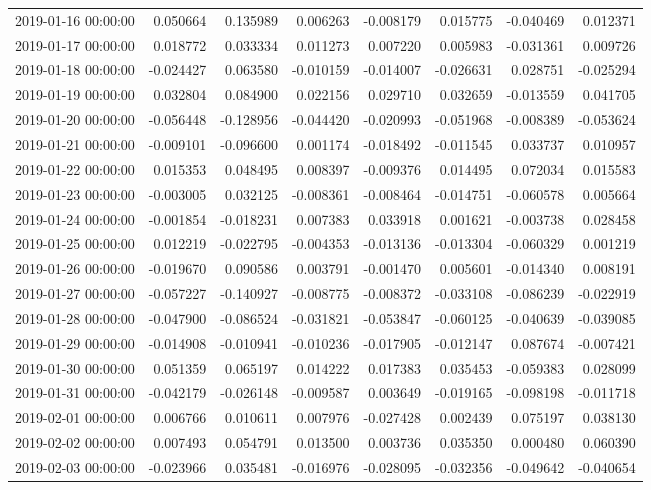 \begin{tabular}{lrrrrrrr}
2019-01-16 00:00:00 & 0.050664 & 0.135989 & 0.006263 & -0.008179 & 0.015775 & -0.040469 & 0.012371 \\
2019-01-17 00:00:00 & 0.018772 & 0.033334 & 0.011273 & 0.007220 & 0.005983 & -0.031361 & 0.009726 \\
2019-01-18 00:00:00 & -0.024427 & 0.063580 & -0.010159 & -0.014007 & -0.026631 & 0.028751 & -0.025294 \\
2019-01-19 00:00:00 & 0.032804 & 0.084900 & 0.022156 & 0.029710 & 0.032659 & -0.013559 & 0.041705 \\
2019-01-20 00:00:00 & -0.056448 & -0.128956 & -0.044420 & -0.020993 & -0.051968 & -0.008389 & -0.053624 \\
2019-01-21 00:00:00 & -0.009101 & -0.096600 & 0.001174 & -0.018492 & -0.011545 & 0.033737 & 0.010957 \\
2019-01-22 00:00:00 & 0.015353 & 0.048495 & 0.008397 & -0.009376 & 0.014495 & 0.072034 & 0.015583 \\
2019-01-23 00:00:00 & -0.003005 & 0.032125 & -0.008361 & -0.008464 & -0.014751 & -0.060578 & 0.005664 \\
2019-01-24 00:00:00 & -0.001854 & -0.018231 & 0.007383 & 0.033918 & 0.001621 & -0.003738 & 0.028458 \\
2019-01-25 00:00:00 & 0.012219 & -0.022795 & -0.004353 & -0.013136 & -0.013304 & -0.060329 & 0.001219 \\
2019-01-26 00:00:00 & -0.019670 & 0.090586 & 0.003791 & -0.001470 & 0.005601 & -0.014340 & 0.008191 \\
2019-01-27 00:00:00 & -0.057227 & -0.140927 & -0.008775 & -0.008372 & -0.033108 & -0.086239 & -0.022919 \\
2019-01-28 00:00:00 & -0.047900 & -0.086524 & -0.031821 & -0.053847 & -0.060125 & -0.040639 & -0.039085 \\
2019-01-29 00:00:00 & -0.014908 & -0.010941 & -0.010236 & -0.017905 & -0.012147 & 0.087674 & -0.007421 \\
2019-01-30 00:00:00 & 0.051359 & 0.065197 & 0.014222 & 0.017383 & 0.035453 & -0.059383 & 0.028099 \\
2019-01-31 00:00:00 & -0.042179 & -0.026148 & -0.009587 & 0.003649 & -0.019165 & -0.098198 & -0.011718 \\
2019-02-01 00:00:00 & 0.006766 & 0.010611 & 0.007976 & -0.027428 & 0.002439 & 0.075197 & 0.038130 \\
2019-02-02 00:00:00 & 0.007493 & 0.054791 & 0.013500 & 0.003736 & 0.035350 & 0.000480 & 0.060390 \\
2019-02-03 00:00:00 & -0.023966 & 0.035481 & -0.016976 & -0.028095 & -0.032356 & -0.049642 & -0.040654 \\

\end{tabular}
